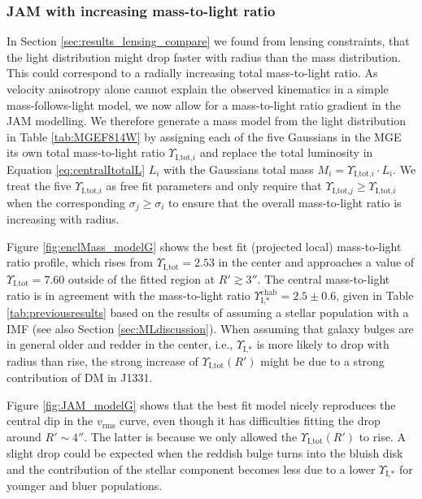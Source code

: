 \documentclass[useAMS,usenatbib]{mnras}
\begin{document}
\subsubsection{JAM with increasing mass-to-light ratio} \label{sec:results_JAM_SB_gradient}

In Section \ref{sec:results_lensing_compare} we found from lensing constraints, that the light distribution might drop faster with radius than the mass distribution. This could correspond to a radially increasing total mass-to-light ratio. As velocity anisotropy alone cannot explain the observed kinematics in a simple mass-follows-light model, we now allow for a mass-to-light ratio gradient in the JAM modelling. We therefore generate a mass model from the light distribution in Table \ref{tab:MGEF814W} by assigning each of the five Gaussians in the MGE its own total mass-to-light ratio $\Upsilon_{\text{I,tot,}i}$ and replace the total luminosity in Equation \eqref{eq:centralItotalL} $L_i$ with the Gaussians total mass $M_i = \Upsilon_{\text{I,tot,}i} \cdot L_i$. We treat the five $\Upsilon_{\text{I,tot,}i}$ as free fit parameters and only require that $\Upsilon_{\text{I,tot,}j} \geq \Upsilon_{\text{I,tot,}i}$ when the corresponding $\sigma_j \geq \sigma_i$ to ensure that the overall mass-to-light ratio is increasing with radius.

Figure \ref{fig:enclMass_modelG} shows the best fit (projected local) mass-to-light ratio profile, which rises from $\Upsilon_\text{I,tot} = 2.53$ in the center and approaches a value of $\Upsilon_\text{I,tot} = 7.60$ outside of the fitted region at $R'\gtrsim 3''$. The central mass-to-light ratio is in agreement with the mass-to-light ratio $\Upsilon_\text{I,*}^\text{chab} = 2.5 \pm 0.6$, given in Table \ref{tab:previousresults} based on the results of \citet{SWELLSI} assuming a stellar population with a \citet{Chabrier2003} IMF (see also Section \ref{sec:MLdiscussion}). When assuming that galaxy bulges are in general older and redder in the center, i.e., $\Upsilon_\text{I,*}$ is more likely to drop with radius than rise, the strong increase of $\Upsilon_\text{I,tot}(R')$ might be due to a strong contribution of DM in J1331.

Figure \ref{fig:JAM_modelG} shows that the best fit model nicely reproduces the central dip in the $v_\text{rms}$ curve, even though it has difficulties fitting the drop around $R' \sim 4''$. The latter is because we only allowed the $\Upsilon_\text{I,tot}(R')$ to rise. A slight drop could be expected when the reddish bulge turns into the bluish disk and the contribution of the stellar component becomes less due to a lower $\Upsilon_\text{I,*}$ for younger and bluer populations.
\end{document}
